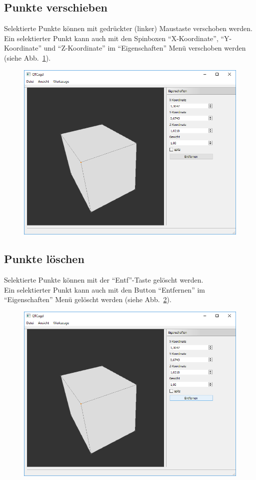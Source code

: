 \subsection{Punkte verschieben}
Selektierte Punkte können mit gedrückter (linker) Maustaste verschoben werden.\\
Ein selektierter Punkt kann auch mit den Spinboxen "`X-Koordinate"', "`Y-Koordinate"' und "`Z-Koordinate"' im "`Eigenschaften"' Menü verschoben werden (siehe Abb.~\ref{fig:PunkteVerschieben}).
\begin{figure}[ht!]
	\centering
	\includegraphics[scale=0.6]{content/pictures/4-PunkteVerschieben}
	\caption{}
	\label{fig:PunkteVerschieben}
\end{figure}
\subsection{Punkte löschen}
Selektierte Punkte können mit der "`Entf"'-Taste  gelöscht werden.\\
Ein selektierter Punkt kann auch mit den Button "`Entfernen"' im "`Eigenschaften"' Menü gelöscht werden (siehe Abb.~\ref{fig:PunkteLoeschen}).
\begin{figure}[ht!]
	\centering
	\includegraphics[scale=0.6]{content/pictures/5-PunkteLoeschen}
	\caption{}
	\label{fig:PunkteLoeschen}	
\end{figure}
